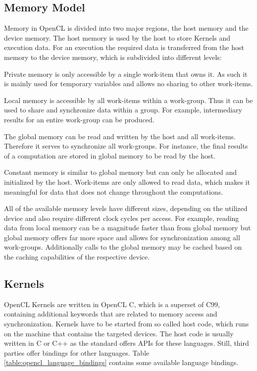 \subsection*{Memory Model}

Memory in OpenCL is divided into two major regions, the host memory and the device memory. The host memory is used by the host to store Kernels and execution data. For an execution the required data is transferred from the host memory to the device memory, which is subdivided into different levels:

\begin{description}[align=left,leftmargin=0cm]
  \item [Private] Private memory is only accessible by a single work-item that owns it. As such it is mainly used for temporary variables and allows no sharing to other work-items.
  \item [Local] Local memory is accessible by all work-items within a work-group. Thus it can be used to share and synchronize data within a group. For example, intermediary results for an entire work-group can be produced.
  \item [Global] The global memory can be read and written by the host and all work-items. Therefore it serves to synchronize all work-groups. For instance, the final results of a computation are stored in global memory to be read by the host.
  \item [Constant] Constant memory is similar to global memory but can only be allocated and initialized by the host. Work-items are only allowed to read data, which makes it meaningful for data that does not change throughout the computations.
\end{description}

All of the available memory levels have different sizes, depending on the utilized device and also require different clock cycles per access. For example, reading data from local memory can be a magnitude faster than from global memory but global memory offers far more space and allows for synchronization among all work-groups. Additionally calls to the global memory may be cached based on the caching capabilities of the respective device.

\subsection*{Kernels}

OpenCL Kernels are written in OpenCL C, which is a superset of C99, containing additional keywords that are related to memory access and synchronization. Kernels have to be started from so called host code, which runs on the machine that contains the targeted devices. The host code is usually written in C or C++ as the standard offers APIs for these languages. Still, third parties offer bindings for other languages. Table \ref{table:opencl_language_bindings} contains some available language bindings.


